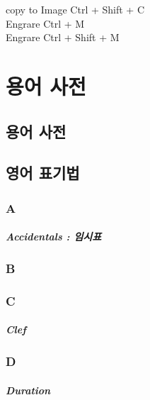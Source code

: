 \documentclass[12pt, a4paper, oneside]{book}
\let\stdsection\section
\renewcommand\section{\newpage\stdsection}
\begin{document}
copy to Image   Ctrl + Shift + C \\
Engrare  	Ctrl + M \\
Engrare  	Ctrl + Shift + M \\




	\chapter{용어 사전}
	\noptcrule
	\parttoc				

	\section{용어 사전}


	\section{영어 표기법}

	\subsection{A}

\paragraph{Accidentals : 임시표}


	\subsection{B}

	\subsection{C}

\paragraph{Clef}


	\subsection{D}

\paragraph{Duration}
\end{document}
